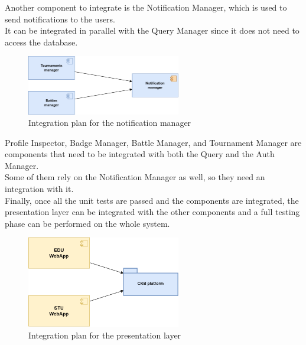 Another component to integrate is the Notification Manager, which is used to send notifications to the users. \\
It can be integrated in parallel with the Query Manager since it does not need to access the database.\\
\begin{figure}[H]
    \centering
    \includegraphics[width=0.6\textwidth]{images/test_plan/test-plan-4.png}
    \caption{Integration plan for the notification manager}
    \label{fig:test-plan-4}
\end{figure}

Profile Inspector, Badge Manager, Battle Manager, and Tournament Manager are components that need to be integrated with both the Query and the Auth Manager.\\
Some of them rely on the Notification Manager as well, so they need an integration with it.\\

Finally, once all the unit tests are passed and the components are integrated, the presentation layer can be integrated with the other components and a full testing phase can be performed on the whole system.\\
\begin{figure}[H]
    \centering
    \includegraphics[width=0.6\textwidth]{images/test_plan/test-plan-5.png}
    \caption{Integration plan for the presentation layer}
    \label{fig:test-plan-5}
\end{figure}

